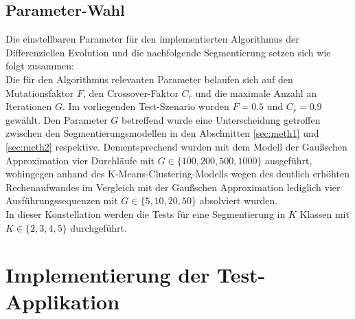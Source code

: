 		\subsection{Parameter-Wahl}
		\label{sub:de-params}
			Die einstellbaren Parameter für den implementierten Algorithmus der Differenziellen Evolution und die nachfolgende Segmentierung setzen sich wie folgt zusammen:\\
			Die für den Algorithmus relevanten Parameter belaufen sich auf den Mutationsfaktor $F$, den Crossover-Faktor $C_{r}$ und die maximale Anzahl an Iterationen $G$. Im vorliegenden Test-Szenario wurden $F = 0.5$ und $C_{r} = 0.9$ gewählt. Den Parameter $G$ betreffend wurde eine Unterscheidung getroffen zwischen den Segmentierungsmodellen in den Abschnitten \ref{sec:meth1} und \ref{sec:meth2} respektive. Dementsprechend wurden mit dem Modell der Gaußschen Approximation vier Durchläufe mit $G \in \{100, 200, 500, 1000\}$ ausgeführt, wohingegen anhand des K-Means-Clustering-Modells wegen des deutlich erhöhten Rechenaufwandes im Vergleich mit der Gaußschen Approximation lediglich vier Ausführungssequenzen mit $G \in \{5, 10, 20, 50\}$ absolviert wurden.\\
			In dieser Konstellation werden die Tests für eine Segmentierung in $K$ Klassen mit $K \in \{2,3,4,5\}$ durchgeführt.

	\section{Implementierung der Test-Applikation}
	\label{sec:implementation}
